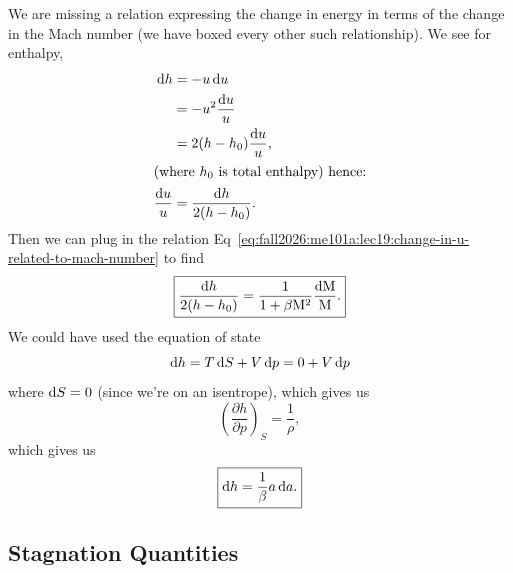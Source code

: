 \begin{node}
We are missing a relation expressing the change in energy in terms of
the change in the Mach number (we have boxed every other such relationship).
We see for enthalpy,
\begin{subequations}
  \begin{align}
\mathrm{d} h &=-u\,\mathrm{d} u\\
&=-u^{2}\frac{\mathrm{d} u}{u}\\
&=2(h-h_{0})\frac{\mathrm{d} u}{u},\\
\intertext{(where $h_{0}$ is total enthalpy) hence:}
\frac{\mathrm{d} u}{u} &= \frac{\mathrm{d} h}{2(h-h_{0})}.
  \end{align}
\end{subequations}
Then we can plug in the relation Eq~\eqref{eq:fall2026:me101a:lec19:change-in-u-related-to-mach-number}
to find
\begin{equation}
\boxed{\frac{\mathrm{d} h}{2(h-h_{0})}=\frac{1}{1+\beta\mathrm{M}^{2}}\frac{\mathrm{d}\mathrm{M}}{\mathrm{M}}.}
\end{equation}
We could have used the equation of state
\begin{equation}
\mathrm{d} h = T\,\mathrm{d} S + V\,\mathrm{d} p = 0 + V\,\mathrm{d} p
\end{equation}
where $\mathrm{d} S=0$ (since we're on an isentrope), which gives us
\begin{equation}
\left(\frac{\partial h}{\partial p}\right)_{S}=\frac{1}{\rho},
\end{equation}
which gives us
\begin{equation}\label{eq:fall2026:me101a:enthalpy-differential}
\boxed{\mathrm{d} h=\frac{1}{\beta}a\,\mathrm{d} a.}
\end{equation}
\end{node}

\subsection{Stagnation Quantities}


